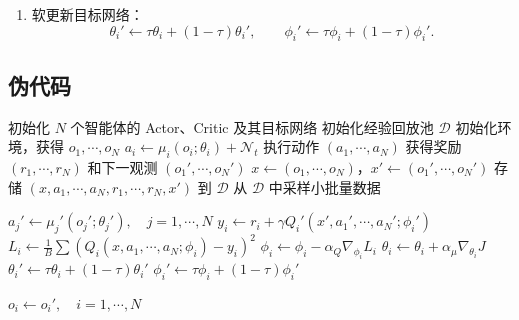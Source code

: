 \documentclass[UTF8]{ctexart}
\begin{document}
\begin{enumerate}
\begin{enumerate}
\begin{enumerate}
            \item 软更新目标网络：
            \[
            \theta_i' \leftarrow \tau\theta_i+(1-\tau)\theta_i',
            \qquad
            \phi_i' \leftarrow \tau\phi_i+(1-\tau)\phi_i'.
            \]
        \end{enumerate}
    \end{enumerate}
\end{enumerate}

\subsection*{伪代码}

\begin{algorithm}[H]
\caption{MADDPG 算法}
\begin{algorithmic}[1]
\State 初始化 $N$ 个智能体的 Actor、Critic 及其目标网络
\State 初始化经验回放池 $\mathcal{D}$
    \State 初始化环境，获得 $o_1,\cdots,o_N$
            \State $a_i \gets \mu_i(o_i;\theta_i)+\mathcal{N}_t$
        \EndFor
        \State 执行动作 $(a_1,\cdots,a_N)$
        \State 获得奖励 $(r_1,\cdots,r_N)$ 和下一观测 $(o_1',\cdots,o_N')$
        \State $x\gets(o_1,\cdots,o_N)$，$x'\gets(o_1',\cdots,o_N')$
        \State 存储 $(x,a_1,\cdots,a_N,r_1,\cdots,r_N,x')$ 到 $\mathcal{D}$
        \State 从 $\mathcal{D}$ 中采样小批量数据
        
            \State $a_j' \gets \mu_j'(o_j';\theta_j'),\quad j=1,\cdots,N$
            \State $y_i \gets r_i+\gamma Q_i'(x',a_1',\cdots,a_N';\phi_i')$
            \State $L_i \gets \frac{1}{B}\sum\left(Q_i(x,a_1,\cdots,a_N;\phi_i)-y_i\right)^2$
            \State $\phi_i \gets \phi_i-\alpha_Q\nabla_{\phi_i}L_i$
            \State $\theta_i \gets \theta_i+\alpha_{\mu}\nabla_{\theta_i}J$
            \State $\theta_i' \gets \tau\theta_i+(1-\tau)\theta_i'$
            \State $\phi_i' \gets \tau\phi_i+(1-\tau)\phi_i'$
        \EndFor
        
        \State $o_i\gets o_i',\quad i=1,\cdots,N$
    \EndFor
\EndFor
\end{algorithmic}
\end{algorithm}
\end{document}
